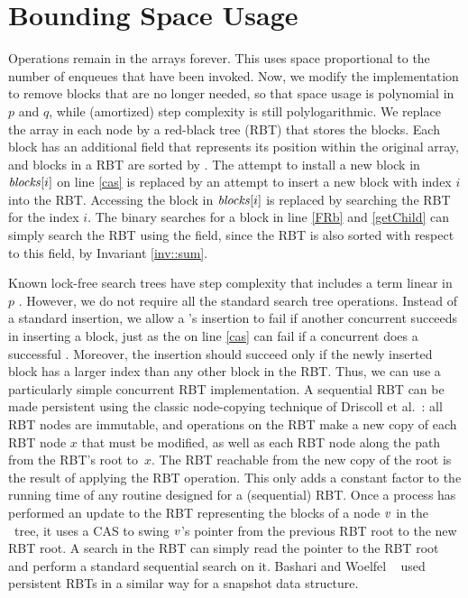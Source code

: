 
\section{Bounding Space Usage}
\label{reducing}

Operations remain in the  arrays forever. 
This uses space proportional to the number of enqueues that have been invoked.
Now, we modify the implementation to remove blocks that are no longer needed, so that space usage is
polynomial in $p$ and $q$, while (amortized) step complexity is still polylogarithmic. We replace the  array in each node by a red-black tree (RBT)
that stores the blocks.
Each block has an additional  field
that represents its position within the original  array, and
blocks in a RBT are sorted by .
The attempt to install a new block in $\mbox{\textit{blocks}}[i]$  on line \ref{cas}
is replaced by an attempt to insert a new block with index $i$ into the RBT.
Accessing the block in $\mbox{\textit{blocks}}[i]$ is 
replaced by searching the RBT for the  index $i$.
The binary searches for a block in line \ref{FRb} and \ref{getChild} can simply search the RBT
using the  field, since the RBT is also sorted with respect to this field, by Invariant \ref{inv::sum}.
 
Known lock-free search trees have step complexity that includes a term linear in $p$ \cite{EFHR14,Ko20}.  
However, we do not require all the standard search tree operations.
Instead of a standard insertion, we allow a 's insertion to fail if another
concurrent  succeeds in inserting a block, just as the  on line \ref{cas}
can fail if a concurrent  does a successful .
Moreover, the insertion should succeed only if the newly inserted block has a larger index than any other block in the RBT.
Thus, we can use a particularly simple concurrent RBT implementation.
A sequential RBT can be made persistent using the classic node-copying technique of 
Driscoll et al.~\cite{DSST89}:  all RBT nodes are immutable, and operations on the 
RBT make a new copy of each RBT node $x$ that must be modified, as well
as each RBT node along the path from the RBT's root to~$x$.
The RBT reachable from the new copy of the root is the result of applying the RBT operation.
This only adds a constant factor to the running time of any routine designed for a (sequential) RBT.
Once a process has performed an update to the RBT representing the blocks of a node 
$\mbox{\textnormal{\textit{v}}}$ in the \ordering\ tree, 
it uses a CAS to swing $\mbox{\textnormal{\textit{v}}}$'s pointer from the previous RBT root to the new RBT root.
A search in the RBT can simply read the pointer to the RBT root and perform a standard
sequential search on it.
Bashari and Woelfel ~\cite{DBLP:conf/podc/BashariW21} used persistent RBTs in a similar way for a snapshot data structure.

